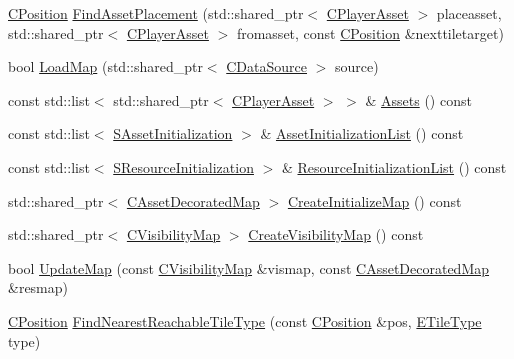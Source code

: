 \begin{DoxyCompactItemize}
\item 
\hyperlink{classCPosition}{C\+Position} \hyperlink{classCAssetDecoratedMap_a82c30235ceaa63c7382c662687acf9fe}{Find\+Asset\+Placement} (std\+::shared\+\_\+ptr$<$ \hyperlink{classCPlayerAsset}{C\+Player\+Asset} $>$ placeasset, std\+::shared\+\_\+ptr$<$ \hyperlink{classCPlayerAsset}{C\+Player\+Asset} $>$ fromasset, const \hyperlink{classCPosition}{C\+Position} \&nexttiletarget)
\item 
bool \hyperlink{classCAssetDecoratedMap_aaf40414c8e291bd45327787ddaf58f31}{Load\+Map} (std\+::shared\+\_\+ptr$<$ \hyperlink{classCDataSource}{C\+Data\+Source} $>$ source)
\item 
const std\+::list$<$ std\+::shared\+\_\+ptr$<$ \hyperlink{classCPlayerAsset}{C\+Player\+Asset} $>$ $>$ \& \hyperlink{classCAssetDecoratedMap_a2f4d2597697593197567877900d55c52}{Assets} () const
\item 
const std\+::list$<$ \hyperlink{structCAssetDecoratedMap_1_1SAssetInitialization}{S\+Asset\+Initialization} $>$ \& \hyperlink{classCAssetDecoratedMap_aa71f42e162c1d3003248306bfa15e69d}{Asset\+Initialization\+List} () const
\item 
const std\+::list$<$ \hyperlink{structCAssetDecoratedMap_1_1SResourceInitialization}{S\+Resource\+Initialization} $>$ \& \hyperlink{classCAssetDecoratedMap_a279fb55e5536131b599275e8629d51cd}{Resource\+Initialization\+List} () const
\item 
std\+::shared\+\_\+ptr$<$ \hyperlink{classCAssetDecoratedMap}{C\+Asset\+Decorated\+Map} $>$ \hyperlink{classCAssetDecoratedMap_a2807be3f5fe7858f476b80fef228fa03}{Create\+Initialize\+Map} () const
\item 
std\+::shared\+\_\+ptr$<$ \hyperlink{classCVisibilityMap}{C\+Visibility\+Map} $>$ \hyperlink{classCAssetDecoratedMap_aa05e81ec37b4217053e8de050e47dba7}{Create\+Visibility\+Map} () const
\item 
bool \hyperlink{classCAssetDecoratedMap_a7b594b6bef2eed8bbb0e4e4e6b855903}{Update\+Map} (const \hyperlink{classCVisibilityMap}{C\+Visibility\+Map} \&vismap, const \hyperlink{classCAssetDecoratedMap}{C\+Asset\+Decorated\+Map} \&resmap)
\item 
\hyperlink{classCPosition}{C\+Position} \hyperlink{classCAssetDecoratedMap_a9e9eed95b427443d196b56b852cdeb9d}{Find\+Nearest\+Reachable\+Tile\+Type} (const \hyperlink{classCPosition}{C\+Position} \&pos, \hyperlink{classCTerrainMap_aff2ab991e237269941416dd79d8871d4}{E\+Tile\+Type} type)
\end{DoxyCompactItemize}
